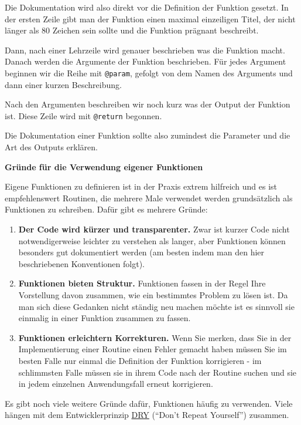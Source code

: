 \documentclass[]{tufte-book}
\providecommand{\tightlist}{%
  \setlength{\itemsep}{0pt}\setlength{\parskip}{0pt}}
\begin{document}
Die Dokumentation wird also direkt vor die Definition der Funktion
gesetzt. In der ersten Zeile gibt man der Funktion einen maximal
einzeiligen Titel, der nicht länger als 80 Zeichen sein sollte und die
Funktion prägnant beschreibt.

Dann, nach einer Lehrzeile wird genauer beschrieben was die Funktion
macht. Danach werden die Argumente der Funktion beschrieben. Für jedes
Argument beginnen wir die Reihe mit \texttt{@param}, gefolgt von dem
Namen des Arguments und dann einer kurzen Beschreibung.

Nach den Argumenten beschreiben wir noch kurz was der Output der
Funktion ist. Diese Zeile wird mit \texttt{@return} begonnen.

Die Dokumentation einer Funktion sollte also zumindest die Parameter und
die Art des Outputs erklären.

\textbf{Gründe für die Verwendung eigener Funktionen}

Eigene Funktionen zu definieren ist in der Praxis extrem hilfreich und
es ist empfehlenswert Routinen, die mehrere Male verwendet werden
grundsätzlich als Funktionen zu schreiben. Dafür gibt es mehrere Gründe:

\begin{enumerate}
\def\labelenumi{\arabic{enumi}.}
\tightlist
\item
  \textbf{Der Code wird kürzer und transparenter.} Zwar ist kurzer Code
  nicht notwendigerweise leichter zu verstehen als langer, aber
  Funktionen können besonders gut dokumentiert werden (am besten indem
  man den hier beschriebenen Konventionen folgt).
\item
  \textbf{Funktionen bieten Struktur.} Funktionen fassen in der Regel
  Ihre Vorstellung davon zusammen, wie ein bestimmtes Problem zu lösen
  ist. Da man sich diese Gedanken nicht ständig neu machen möchte ist es
  sinnvoll sie einmalig in einer Funktion zusammen zu fassen.
\item
  \textbf{Funktionen erleichtern Korrekturen.} Wenn Sie merken, dass Sie
  in der Implementierung einer Routine einen Fehler gemacht haben müssen
  Sie im besten Falle nur einmal die Definition der Funktion korrigieren
  - im schlimmsten Falle müssen sie in ihrem Code nach der Routine
  suchen und sie in jedem einzelnen Anwendungsfall erneut korrigieren.
\end{enumerate}

Es gibt noch viele weitere Gründe dafür, Funktionen häufig zu verwenden.
Viele hängen mit dem Entwicklerprinzip
\href{https://de.wikipedia.org/wiki/Don\%E2\%80\%99t_repeat_yourself}{DRY}
(``Don't Repeat Yourself'') zusammen.
\end{document}
